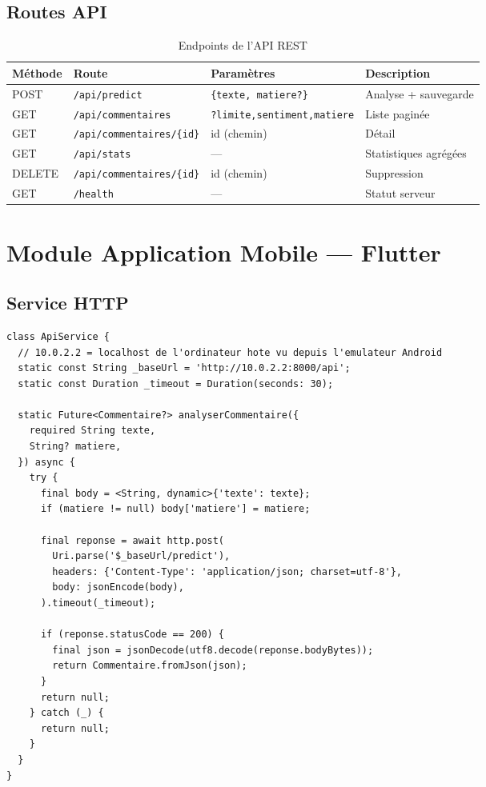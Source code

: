 \documentclass[12pt,a4paper,oneside]{report}
\begin{document}
\subsection{Routes API}

\begin{table}[H]
\centering
\caption{Endpoints de l'API REST}
\label{tab:endpoints}
\renewcommand{\arraystretch}{1.5}
\begin{tabular}{llp{3.5cm}p{3.8cm}}
\toprule
\rowcolor{bleuprincipal!15}
\textbf{Méthode} & \textbf{Route} & \textbf{Paramètres} & \textbf{Description} \\
\midrule
\rowcolor{vertprincipal!10}
POST & \texttt{/api/predict} & \texttt{\{texte, matiere?\}} & Analyse + sauvegarde \\
GET & \texttt{/api/commentaires} & \texttt{?limite,sentiment,matiere} & Liste paginée \\
\rowcolor{gray!8}
GET & \texttt{/api/commentaires/\{id\}} & id (chemin) & Détail \\
GET & \texttt{/api/stats} & --- & Statistiques agrégées \\
\rowcolor{rougeprincipal!10}
DELETE & \texttt{/api/commentaires/\{id\}} & id (chemin) & Suppression \\
GET & \texttt{/health} & --- & Statut serveur \\
\bottomrule
\end{tabular}
\end{table}

\section{Module Application Mobile --- Flutter}

\subsection{Service HTTP}

\begin{lstlisting}[style=styleDart,caption={Service HTTP Flutter},label={lst:flutter_api}]
class ApiService {
  // 10.0.2.2 = localhost de l'ordinateur hote vu depuis l'emulateur Android
  static const String _baseUrl = 'http://10.0.2.2:8000/api';
  static const Duration _timeout = Duration(seconds: 30);

  static Future<Commentaire?> analyserCommentaire({
    required String texte,
    String? matiere,
  }) async {
    try {
      final body = <String, dynamic>{'texte': texte};
      if (matiere != null) body['matiere'] = matiere;

      final reponse = await http.post(
        Uri.parse('$_baseUrl/predict'),
        headers: {'Content-Type': 'application/json; charset=utf-8'},
        body: jsonEncode(body),
      ).timeout(_timeout);

      if (reponse.statusCode == 200) {
        final json = jsonDecode(utf8.decode(reponse.bodyBytes));
        return Commentaire.fromJson(json);
      }
      return null;
    } catch (_) {
      return null;
    }
  }
}
\end{lstlisting}
\end{document}
